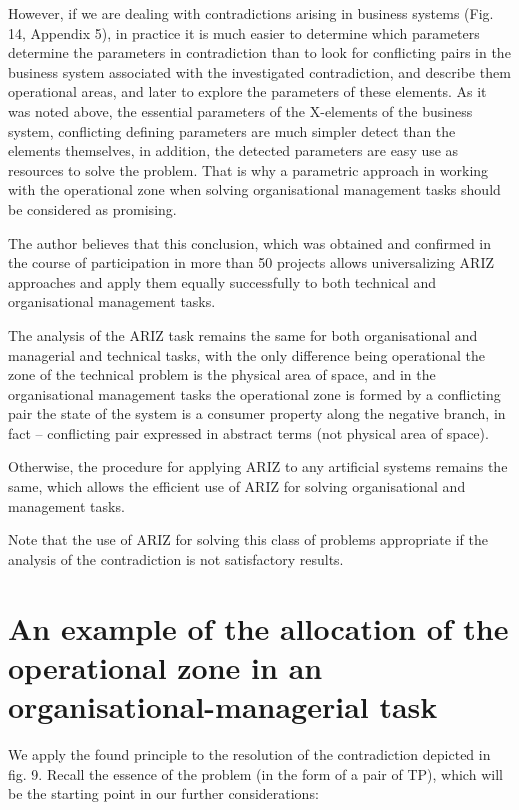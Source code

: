 \documentclass[11pt,a4paper]{book}
\begin{document}
However, if we are dealing with contradictions arising in business systems
(Fig. 14, Appendix 5), in practice it is much easier to determine which
parameters determine the parameters in contradiction than to look for
conflicting pairs in the business system associated with the investigated
contradiction, and describe them operational areas, and later to explore the
parameters of these elements. As it was noted above, the essential parameters
of the X-elements of the business system, conflicting defining parameters are
much simpler detect than the elements themselves, in addition, the detected
parameters are easy use as resources to solve the problem. That is why a
parametric approach in working with the operational zone when solving
organisational management tasks should be considered as promising.

The author believes that this conclusion, which was obtained and confirmed in
the course of participation in more than 50 projects allows universalizing
ARIZ approaches and apply them equally successfully to both technical and
organisational management tasks.

The analysis of the ARIZ task remains the same for both organisational and
managerial and technical tasks, with the only difference being operational the
zone of the technical problem is the physical area of space, and in the
organisational management tasks the operational zone is formed by a
conflicting pair the state of the system is a consumer property along the
negative branch, in fact -- conflicting pair expressed in abstract terms (not
physical area of space).

Otherwise, the procedure for applying ARIZ to any artificial systems remains
the same, which allows the efficient use of ARIZ for solving organisational
and management tasks.

Note that the use of ARIZ for solving this class of problems appropriate if
the analysis of the contradiction is not satisfactory results.

\section{An example of the allocation of the operational zone in an
  organisational-managerial task}

We apply the found principle to the resolution of the contradiction depicted
in fig. 9. Recall the essence of the problem (in the form of a pair of TP),
which will be the starting point in our further considerations:
\end{document}
